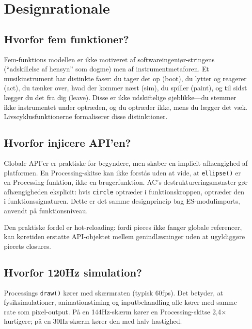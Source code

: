 \documentclass[10pt,letterpaper,twocolumn]{article}
\begin{document}

\section{Designrationale}
\label{sec:rationale}

\subsection{Hvorfor fem funktioner?}

Fem-funktions modellen er ikke motiveret af softwareingeniør-stringens (``adskillelse af hensyn'' som dogme) men af instrumentmetaforen. Et musikinstrument har distinkte faser: du tager det op (boot), du lytter og reagerer (act), du tænker over, hvad der kommer næst (sim), du spiller (paint), og til sidst lægger du det fra dig (leave). Disse er ikke udskiftelige øjeblikke---du stemmer ikke instrumentet under optræden, og du optræder ikke, mens du lægger det væk. Livscyklusfunktionerne formaliserer disse distinktioner.

\subsection{Hvorfor injicere API'en?}

Globale API'er er praktiske for begyndere, men skaber en implicit afhængighed af platformen. En Processing-skitse kan ikke forstås uden at vide, at \texttt{ellipse()} er en Processing-funktion, ikke en brugerfunktion. AC's destruktureringsmønster gør afhængigheden eksplicit: hvis \texttt{circle} optræder i funktionskroppen, optræder den i funktionssignaturen. Dette er det samme designprincip bag ES-modulimports, anvendt på funktionsniveau.

Den praktiske fordel er hot-reloading: fordi pieces ikke fanger globale referencer, kan køretiden erstatte API-objektet mellem genindlæsninger uden at ugyldiggøre piecets closures.

\subsection{Hvorfor 120Hz simulation?}

Processings \texttt{draw()} kører med skærmraten (typisk 60fps). Det betyder, at fysiksimulationer, animationstiming og inputbehandling alle kører med samme rate som pixel-output. På en 144Hz-skærm kører en Processing-skitse 2,4$\times$ hurtigere; på en 30Hz-skærm kører den med halv hastighed.
\end{document}
